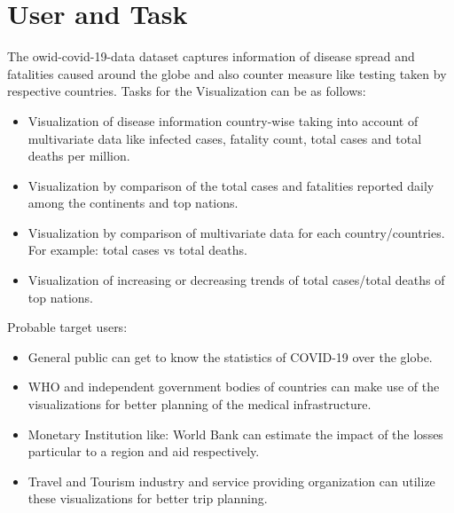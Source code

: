 \documentclass[10pt]{article}
\begin{document}
\section{User and Task}
The owid-covid-19-data dataset captures information of disease spread and fatalities caused around the globe and also counter measure like testing taken by respective countries.\newline
Tasks for the Visualization can be as follows:
\begin{itemize}
    \item Visualization of disease information country-wise taking into account of multivariate data like infected cases, fatality count, total cases and total deaths per million.
    \item Visualization by comparison of the total cases and fatalities reported daily among the continents and top nations.
    \item Visualization by comparison of multivariate data for each country/countries. For example: total cases vs total deaths.
    \item Visualization of increasing or decreasing trends of total cases/total deaths of top nations.
\end{itemize}
Probable target users:
\begin{itemize}
    \item General public can get to know the statistics of COVID-19 over the globe. 
    \item WHO and independent government bodies of countries can make use of the visualizations for better planning of the medical infrastructure. 
    \item Monetary Institution like: World Bank can estimate the impact of the losses particular to a region and aid respectively.
    \item Travel and Tourism industry and service providing organization can utilize these visualizations for better trip planning.
\end{itemize}
\end{document}
